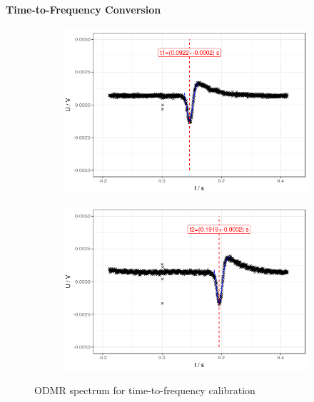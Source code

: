 \paragraph{Time-to-Frequency Conversion}

\begin{figure}
	\begin{subfigure}{0.5\textwidth}
		\includegraphics[width=\textwidth]{../figures/odmr-cal-4.png}
	\end{subfigure}
	\begin{subfigure}{0.5\textwidth}
		\includegraphics[width=\textwidth]{../figures/odmr-cal-3.png}
	\end{subfigure}
	\caption{ODMR spectrum for time-to-frequency calibration}
	\label{fig:odmr-shift}
\end{figure}

